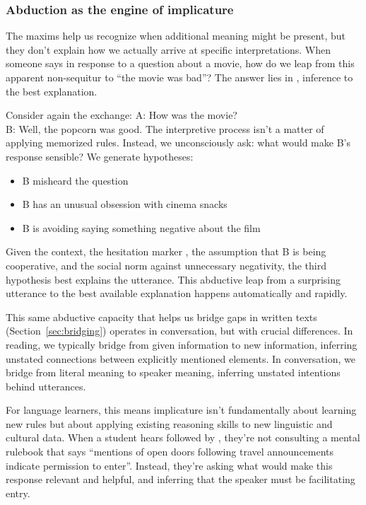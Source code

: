 \subsubsection{Abduction as the engine of implicature}\label{sec:abduction-implicature}

The maxims help us recognize when additional meaning might be present, but they don't explain how we actually arrive at specific interpretations. When someone says  in response to a question about a movie, how do we leap from this apparent non-sequitur to \enquote{the movie was bad}? The answer lies in , inference to the best explanation.

Consider again the exchange:
\ea
   A: How was the movie?\\
   B: Well, the popcorn was good.
\z
The interpretive process isn't a matter of applying memorized rules. Instead, we unconsciously ask: what would make B's response sensible? We generate hypotheses:
\begin{itemize}[noitemsep]
   \item B misheard the question
   \item B has an unusual obsession with cinema snacks
   \item B is avoiding saying something negative about the film
\end{itemize}

Given the context, the hesitation marker , the assumption that B is being cooperative, and the social norm against unnecessary negativity, the third hypothesis best explains the utterance. This abductive leap from a surprising utterance to the best available explanation happens automatically and rapidly.

This same abductive capacity that helps us bridge gaps in written texts (Section~\ref{sec:bridging}) operates in conversation, but with crucial differences. In reading, we typically bridge from given information to new information, inferring unstated connections between explicitly mentioned elements. In conversation, we bridge from literal meaning to speaker meaning, inferring unstated intentions behind utterances.

For language learners, this means implicature isn't fundamentally about learning new rules but about applying existing reasoning skills to new linguistic and cultural data. When a student hears  followed by , they're not consulting a mental rulebook that says \enquote{mentions of open doors following travel announcements indicate permission to enter}. Instead, they're asking what would make this response relevant and helpful, and inferring that the speaker must be facilitating entry.

